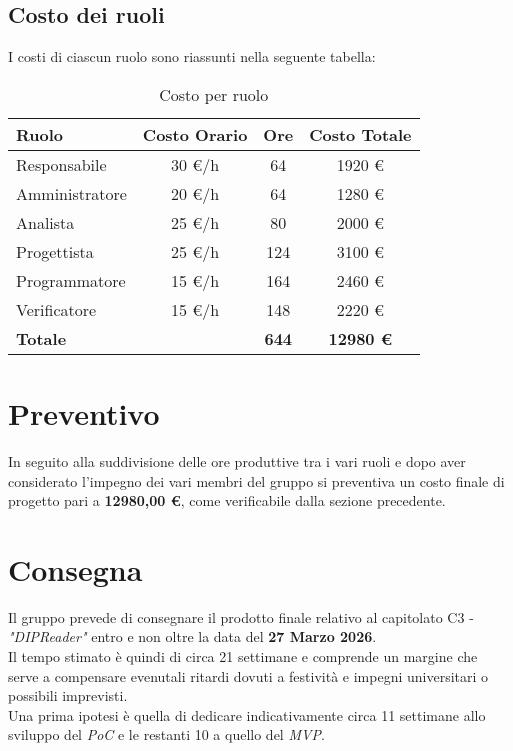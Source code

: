 \documentclass[a4paper,12pt]{article}
\begin{document}
{        \subsection{Costo dei ruoli} {
            I costi di ciascun ruolo sono riassunti nella seguente tabella:
            \begin{table}[h!]
                \centering
                \begin{tabularx}{\textwidth}{|X|c|c|c|}
                    \hline
                    \rowcolor{lightgray}
                    \textbf{Ruolo} & \textbf{Costo Orario} & \textbf{Ore} & \textbf{Costo Totale} \\
                    \hline
                    Responsabile & 30 \euro/h & 64 & 1920 \euro \\
                    \hline
                    Amministratore & 20 \euro/h & 64 & 1280 \euro \\
                    \hline
                    Analista & 25 \euro/h & 80 & 2000 \euro \\
                    \hline
                    Progettista & 25 \euro/h & 124 & 3100 \euro \\
                    \hline
                    Programmatore & 15 \euro/h & 164 & 2460 \euro \\
                    \hline
                    Verificatore & 15 \euro/h & 148 & 2220 \euro \\
                    \hline
                    \textbf{Totale} &  & \textbf{644} & \textbf{12980 \euro} \\
                    \hline
                \end{tabularx}
                \caption{Costo per ruolo}
            \end{table}
        }
    }

    \section{Preventivo} {
        In seguito alla suddivisione delle ore produttive tra i vari ruoli e dopo aver considerato l'impegno dei vari membri del gruppo si preventiva un costo finale di progetto pari a \textbf{12980,00 \euro}, come verificabile dalla sezione precedente.

    }
    
    \section{Consegna} {
        Il gruppo prevede di consegnare il prodotto finale relativo al capitolato C3 - \textit{"DIPReader"} entro e non oltre la data del \textbf{27 Marzo 2026}.\\
        Il tempo stimato è quindi di circa 21 settimane e comprende un margine che serve a compensare evenutali ritardi dovuti a festività e impegni universitari o possibili imprevisti.\\
        Una prima ipotesi è quella di dedicare indicativamente circa 11 settimane allo sviluppo del \textit{PoC} e le restanti 10 a quello del \textit{MVP}.
    }
\end{document}
